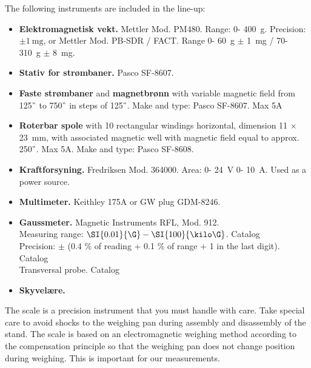 \documentclass[../Elmag-labhefte-2020.tex]{subfiles}
\begin{document}
The following instruments are included in the line-up:
\vspace{-4mm}
\begin{itemize}
    \item \textbf{Elektromagnetisk vekt.} Mettler Mod. PM480. Range: 0- \SI{400}{\g}. Precision: $\pm \SI{1}{\milli\g}$, or Mettler Mod. PB-SDR / FACT. Range 0- \SI{60}{\g} $\pm$ \SI{1}{\milli\g} / 70- \SI{310}{\g} $\pm$ \SI{8}{\milli\g}.
    \item \textbf{Stativ for strømbaner.} Pasco SF-8607.
    \item \textbf{Faste strømbaner} and \textbf{magnetbrønn} with variable magnetic field from \SI{125}{\G} to \SI{750}{\G} in steps of \SI{125}{\G}. Make and type: Pasco SF-8607. Max 5A
    \item \textbf{Roterbar spole} with 10 rectangular windings horizontal, dimension 11 $\times$ \SI{23}{\mm}, with associated magnetic well with magnetic field equal to approx. \SI{250}{\G}. Max 5A.
    Make and type: Pasco SF-8608.
    \item \textbf{Kraftforsyning.} Fredriksen Mod. 364000. Area: 0- \SI{24}{\volt} 0- \SI{10}{\ampere}. Used as a power source.
    \item \textbf{Multimeter.} Keithley 175A or GW plug GDM-8246.
    \item \textbf{Gaussmeter.} Magnetic Instruments RFL, Mod. 912. \\
    Measuring range: \(\SI{0.01}{\G} - \SI{100}{\kilo\G} \). Catalog \\
    Precision: \(\pm \) (0.4 \% of reading + 0.1 \% of range + 1 in the last digit). Catalog \\
    Transversal probe.
    Catalog \item \textbf{Skyvelære.}
\end{itemize}

The scale is a precision instrument that you must handle with care. Take special care to avoid shocks to the weighing pan during assembly and disassembly of the stand. The scale is based on an electromagnetic weighing method according to the compensation principle so that the weighing pan does not change position during weighing. This is important for our measurements.

\end{document}

